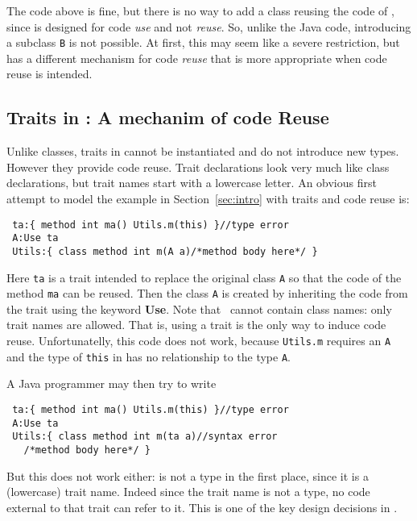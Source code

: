 The \name code above is fine, but there is no way to add a class 
\Q@B@ reusing the code of \Q@A@, since
\Q@A@ is designed for code \emph{use} and not \emph{reuse}. So, unlike
the Java code, introducing a subclass
\lstinline{B} is not possible. At first, this may seem like a severe restriction, but
\name has a different mechanism for code \emph{reuse} that 
is more appropriate when code reuse is intended. 

\subsection{Traits in \name: A mechanim of code Reuse}

Unlike classes, traits in \name cannot be instantiated and do not introduce new
types. However they provide code reuse.
Trait declarations 
look very much like class declarations, but trait names 
start with a lowercase letter. An obvious first attempt 
to model the example in Section~\ref{sec:intro} 
with traits and code reuse is:

\begin{lstlisting}
 ta:{ method int ma() Utils.m(this) }//type error
 A:Use ta
 Utils:{ class method int m(A a)/*method body here*/ }
\end{lstlisting}

\noindent Here \lstinline{ta} is a trait intended to replace the
original class \lstinline{A} so that the code of the method
\lstinline{ma} can be reused. Then the class \lstinline{A} 
is created by inheriting the code from the trait using the keyword 
{\bf Use}. Note that \use\ cannot contain class names: only trait
names are allowed.
That is, using a trait is the only way to induce code reuse.
Unfortunatelly, this code does not work, 
because \lstinline{Utils.m} requires an \lstinline{A} and the type of \lstinline{this} in
\Q@ta@ has no relationship to the type \lstinline{A}.

A Java programmer may then try to write
\begin{lstlisting}
 ta:{ method int ma() Utils.m(this) }//type error
 A:Use ta
 Utils:{ class method int m(ta a)//syntax error
   /*method body here*/ }
\end{lstlisting}
But this does not work either: \Q@ta@ is not a type in the first place, since it is a (lowercase) trait name.
Indeed
since the trait name is not a type, no code external to that trait can
refer to it. This is one of the key design decisions in \name. 

